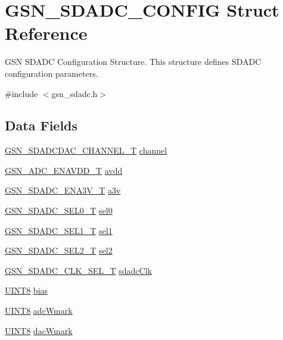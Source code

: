 \hypertarget{a00213}{
\section{GSN\_\-SDADC\_\-CONFIG Struct Reference}
\label{a00213}
}


GSN SDADC Configuration Structure. This structure defines SDADC configuration parameters.  




{\ttfamily \#include $<$gsn\_\-sdadc.h$>$}

\subsection*{Data Fields}
\begin{DoxyCompactItemize}
\item 
\hyperlink{a00583_ad966c1e6c604f6107d0b76e6390e58ff}{GSN\_\-SDADCDAC\_\-CHANNEL\_\-T} \hyperlink{a00213_a638b26520e830eef1ebe306f07682c83}{channel}
\item 
\hyperlink{a00652_ga46353c29cf1b862e0ab85b39b68176af}{GSN\_\-ADC\_\-ENAVDD\_\-T} \hyperlink{a00213_a68990146d77efa0a03f6389e13f8c17d}{avdd}
\item 
\hyperlink{a00652_ga7c75febfa676ff7198e6665692e07c61}{GSN\_\-SDADC\_\-ENA3V\_\-T} \hyperlink{a00213_af7e5e603dcaafcd8d75988a25febe87b}{a3v}
\item 
\hyperlink{a00652_ga1211f3eac3c8c6697324a356da4dbcb7}{GSN\_\-SDADC\_\-SEL0\_\-T} \hyperlink{a00213_a26c20ee3ed05a076f49a8e5a651490e7}{sel0}
\item 
\hyperlink{a00652_ga851e1269993bbdc128b392fd7216ade7}{GSN\_\-SDADC\_\-SEL1\_\-T} \hyperlink{a00213_a56264ad77b6d679a8ea0f6c6d06ee3ee}{sel1}
\item 
\hyperlink{a00652_ga21776f699fb060e738c464107e435df4}{GSN\_\-SDADC\_\-SEL2\_\-T} \hyperlink{a00213_a2e821b5cf1abb02f5f69c3f583296ac6}{sel2}
\item 
\hyperlink{a00652_ga3e84e460cc728aac5ff89621cc0ede91}{GSN\_\-SDADC\_\-CLK\_\-SEL\_\-T} \hyperlink{a00213_a3d39458493da690814b673844c20744e}{sdadcClk}
\item 
\hyperlink{a00660_gab27e9918b538ce9d8ca692479b375b6a}{UINT8} \hyperlink{a00213_a79b233a1b97d14e0d4bd3827cf9f352a}{bias}
\item 
\hyperlink{a00660_gab27e9918b538ce9d8ca692479b375b6a}{UINT8} \hyperlink{a00213_a43e7060c1e6d911594dfefb04bbeeb87}{adcWmark}
\item 
\hyperlink{a00660_gab27e9918b538ce9d8ca692479b375b6a}{UINT8} \hyperlink{a00213_a53535fa0dbf62414d05cdd55ffc632b0}{dacWmark}

\end{DoxyCompactItemize}
